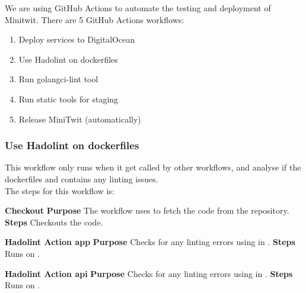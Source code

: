 We are using GitHub Actions to automate the testing and deployment of Minitwit. There are 5 GitHub Actions workflows:
\begin{enumerate}
    \item Deploy services to DigitalOcean
    \item Use Hadolint on dockerfiles
    \item Run golangci-lint tool
    \item Run static tools for staging 
    \item Release MiniTwit (automatically)
\end{enumerate}

\subsubsection{Use Hadolint on dockerfiles}
This workflow only runs when it get called by other workflows, and analyse if the dockerfiles  and  contains any linting issues.\\
The steps for this workflow is:
\begin{outline}[enumerate]
    \1 \textbf{Checkout}
        \2 \textbf{Purpose} 
            \3 The workflow uses  to fetch the code from the repository.
        \2 \textbf{Steps}
            \3 Checkouts the code.

        
    \1 \textbf{Hadolint Action app}
        \2 \textbf{Purpose}
            \3 Checks for any linting errors using  in .
        \2 \textbf{Steps}
            \3 Runs  on .
    
        
    \1 \textbf{Hadolint Action api}
        \2 \textbf{Purpose}
            \3 Checks for any linting errors using  in .
        \2 \textbf{Steps}
            \3 Runs  on .
\end{outline}


